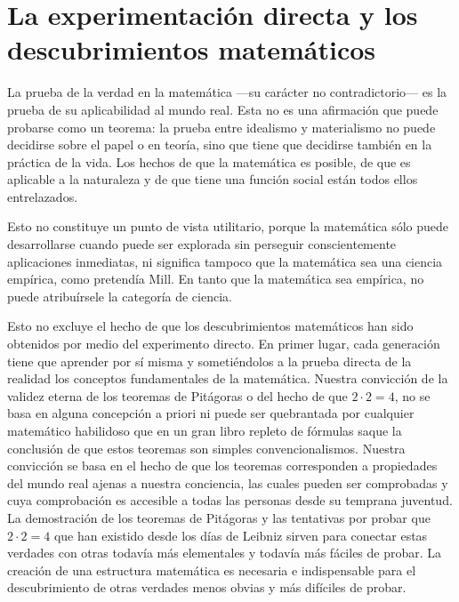 \documentclass[a4paper, 12pt]{article}
\begin{document}
{{\section*{La experimentación directa y los descubrimientos
matemáticos}

La prueba de la verdad en la matemática ---su carácter no contradicto\-rio--- es
la prueba de su aplicabilidad al mundo real. Esta no es una afirmación que puede
probarse como un teorema: la prueba entre idealismo y materialismo no puede
decidirse sobre el papel o en teoría, sino que tiene que decidirse también en la
práctica de la vida. Los hechos de que la matemática es posible, de que es
aplicable a la naturaleza y de que tiene una función social están todos ellos
entrelazados.

Esto no constituye un punto de vista utilitario, porque la matemática sólo puede
desarrollarse cuando puede ser explorada sin perseguir conscientemente
aplicaciones inmediatas, ni significa tampoco que la matemática sea una ciencia
empírica, como pretendía Mill. En tanto que la matemática sea empírica, no puede
atribuírsele la categoría de ciencia.

Esto no excluye el hecho de que los descubrimientos matemáticos han sido
obtenidos por medio del experimento directo. En primer lugar, cada generación
tiene que aprender por sí misma y sometiéndolos a la prueba directa de la
realidad los conceptos fundamentales de la matemática. Nuestra convicción de la
validez eterna de los teoremas de Pitágoras o del hecho de que $2 \cdot  2 = 4$,
no se basa en alguna concepción a priori ni puede ser quebrantada por cualquier
matemático habilidoso que en un gran libro repleto de fórmulas saque la
conclusión de que estos teoremas son simples convencionalismos. Nuestra
convicción se basa en el hecho de que los teoremas corresponden a propiedades
del mundo real ajenas a nuestra conciencia, las cuales pueden ser comprobadas y
cuya comprobación es accesible a todas las personas desde su temprana juventud.
La demostración de los teoremas de Pitágoras y las tentativas por probar que $2
\cdot  2 = 4$ que han existido desde los días de Leibniz sirven para conectar
estas verdades con otras todavía más elementales y todavía más fáciles de
probar. La creación de una estructura matemática es necesaria e indispensable
para el descubrimiento de otras verdades menos obvias y más difíciles de probar.

}}
\end{document}

